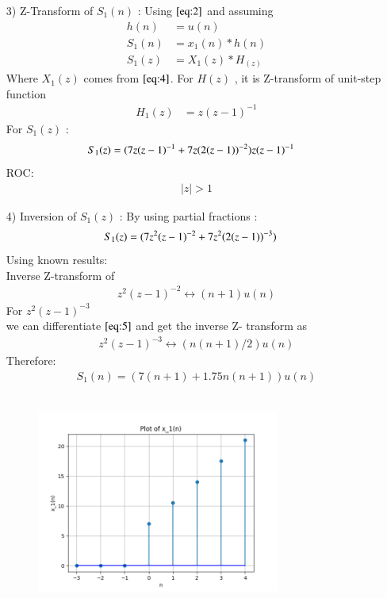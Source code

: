 \documentclass[journal,12pt,twocolumn]{IEEEtran}
\theoremstyle{remark}
\begin{document}
\begin{enumerate}
\vspace{0.7cm}
\item[3)]
Z-Transform of $S_1(n)$ :
Using $\eqref{eq:2}$ and assuming 
\begin{align}
         h(n) &= u(n) \\
    S_1(n) &= x_1(n) * h(n) \\
    S_1(z) &= X_1(z) * H_(z)
    \end{align}
    Where $X_1(z)$ comes from $\eqref{eq:4}$.
    \vspace{0.05cm}
    For $H(z)$ , it is Z-transform of unit-step function
    \begin{align}
        H_1(z) &= z(z-1)^{-1} \label{eq:9}
    \end{align}
    For $S_1(z)$ :
    \begin{align}
S_1(z) &= \notag(7z(z-1)^{-1}+
7z(2(z-1))^{-2})z(z-1)^{-1}
    \end{align}
    ROC:
    \begin{align} 
    \lvert z \rvert > 1
    \end{align}
    
    \item[4)]
Inversion of $S_1(z)$ :
By using partial fractions :
\begin{align}
    S_1(z) &= \notag(7z^2(z-1)^{-2} + 7z^2(2(z-1))^{-3}) 
\end{align}
Using known results:\\
  Inverse Z-transform of
\begin{align}
        z^2(z-1)^{-2} \leftrightarrow (n+1)u(n)\label{eq:5}
\end{align}
    For $z^2(z-1)^{-3}$\\
    
    we can differentiate $\eqref{eq:5}$ and get the inverse Z- transform as 
    \begin{align}
          z^2(z-1)^{-3} \leftrightarrow (n(n+1)/2)u(n) \label{eq:7}
    \end{align}
    Therefore:
\begin{align}
 S_1(n) = (7(n+1) + 1.75n(n+1))u(n)
\end{align}
\\
    \begin{figure}[!ht]
    \centering
\graphicspath{ {figs/} }
\includegraphics[width=8cm, height=6cm]{graph_1}
\captionsetup{Graph:1 $x_1(n)$ vs n }
\end{figure}
    












\end{enumerate}
\end{document}
